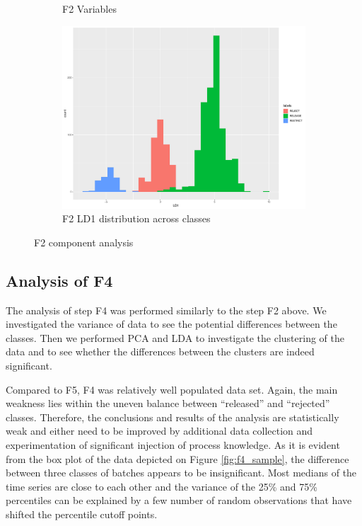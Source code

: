 \begin{figure}[ht!]
\begin{subfigure}{0.3\textwidth}
\begin{center}
        \end{center}
        \caption{F2 Variables}
        \label{fig:f2_variables}
    \end{subfigure}%
    \begin{subfigure}{0.3\textwidth}
        \begin{center}
        \includegraphics[width=\textwidth]{plots/f2_LD1.pdf}
        \end{center}
        \caption{F2 LD1 distribution across classes}
        \label{fig:f2_LD1}
    \end{subfigure}
    \caption{F2 component analysis}
\end{figure}


\subsection{Analysis of F4}
The analysis of step F4 was performed similarly to the step F2 above. We investigated the variance of data to see the potential differences between the classes. Then we performed PCA and LDA to investigate the clustering of the data and to see whether the differences between the clusters are indeed significant.

Compared to F5, F4 was relatively well populated data set. Again, the main weakness lies within the uneven balance between ``released'' and ``rejected'' classes. Therefore, the conclusions and results of the analysis are statistically weak and either need to be improved by additional data collection and experimentation of significant injection of process knowledge. As it is evident from the box plot of the data depicted on Figure \ref{fig:f4_sample}, the difference between three classes of batches appears to be insignificant. Most medians of the time series are close to each other and the variance of the 25\% and 75\% percentiles can be explained by a few number of random observations that have shifted the percentile cutoff points. 

